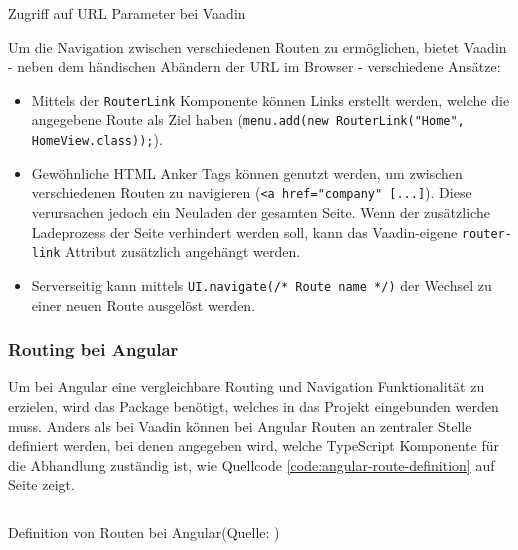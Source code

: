 \documentclass[a4paper,12pt,twoside]{scrreprt}
\begin{document}
\begin{listing}[ht]
    \inputminted[fontsize=\footnotesize,linenos]{java}{code/Luidold_Vaadin-URL-params.java}
    \caption[Zugriff auf URL Parameter bei Vaadin]{Zugriff auf URL Parameter bei Vaadin}
    \label{code:url-params-vaadin}
\end{listing}

\smallskip

Um die Navigation zwischen verschiedenen Routen zu ermöglichen, bietet Vaadin - neben dem händischen Abändern der URL im Browser - verschiedene Ansätze:

\begin{itemize}
    \item Mittels der \texttt{RouterLink} Komponente können Links erstellt werden, welche die angegebene Route als Ziel haben (\texttt{menu.add(new RouterLink("Home", HomeView.class));}). \parencite[][Using the RouterLink Component]{vaadin_ltd_navigating_2021}
    \item Gewöhnliche HTML Anker Tags können genutzt werden, um zwischen verschiedenen Routen zu navigieren (\texttt{<a href="company" [...]}). Diese verursachen jedoch ein Neuladen der gesamten Seite. Wenn der zusätzliche Ladeprozess der Seite verhindert werden soll, kann das Vaadin-eigene \texttt{router-link} Attribut zusätzlich angehängt werden. \parencite[][Using Standard href Links]{vaadin_ltd_navigating_2021}
    \item Serverseitig kann mittels \texttt{UI.navigate(/* Route name */)} der Wechsel zu einer neuen Route ausgelöst werden. \parencite[][Server-side Navigation]{vaadin_ltd_navigating_2021}
\end{itemize}

\subsubsection{Routing bei Angular}
\label{sub-sub-sec:routing-herangehensweise-angular}
Um bei Angular eine vergleichbare Routing und Navigation Funktionalität zu erzielen, wird das  Package benötigt, welches in das Projekt eingebunden werden muss. Anders als bei Vaadin können bei Angular Routen an zentraler Stelle definiert werden, bei denen angegeben wird, welche TypeScript Komponente für die Abhandlung zuständig ist, wie Quellcode \ref{code:angular-route-definition} auf Seite \pageref{code:angular-route-definition} zeigt. \parencite[][]{google_llc_angular_nodate}

\begin{listing}[ht]
    \inputminted[fontsize=\footnotesize,linenos]{js}{code/Angular_Routes-definition.js}
    \caption[Definition von Routen bei Angular]{Definition von Routen bei Angular\newline(Quelle: \cite[][]{google_llc_angular_nodate})}
    \label{code:angular-route-definition}
\end{listing}
\end{document}

